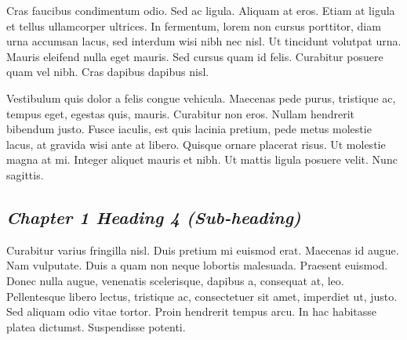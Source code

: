 Cras faucibus condimentum odio. Sed ac ligula. Aliquam at eros. Etiam at ligula et tellus ullamcorper ultrices. In fermentum, lorem non cursus porttitor, diam urna accumsan lacus, sed interdum wisi nibh nec nisl. Ut tincidunt volutpat urna. Mauris eleifend nulla eget mauris. Sed cursus quam id felis. Curabitur posuere quam vel nibh. Cras dapibus dapibus nisl.\par

Vestibulum quis dolor a felis congue vehicula. Maecenas pede purus, tristique ac, tempus eget, egestas quis, mauris. Curabitur non eros. Nullam hendrerit bibendum justo. Fusce iaculis, est quis lacinia pretium, pede metus molestie lacus, at gravida wisi ante at libero. Quisque ornare placerat risus. Ut molestie magna at mi. Integer aliquet mauris et nibh. Ut mattis ligula posuere velit. Nunc sagittis.\par

\subsection{\emph{Chapter 1 Heading 4 (Sub-heading)}}

Curabitur varius fringilla nisl. Duis pretium mi euismod erat. Maecenas id augue. Nam vulputate. Duis a quam non neque lobortis malesuada. Praesent euismod. Donec nulla augue, venenatis scelerisque, dapibus a, consequat at, leo. Pellentesque libero lectus, tristique ac, consectetuer sit amet, imperdiet ut, justo. Sed aliquam odio vitae tortor. Proin hendrerit tempus arcu. In hac habitasse platea dictumst. Suspendisse potenti.\par